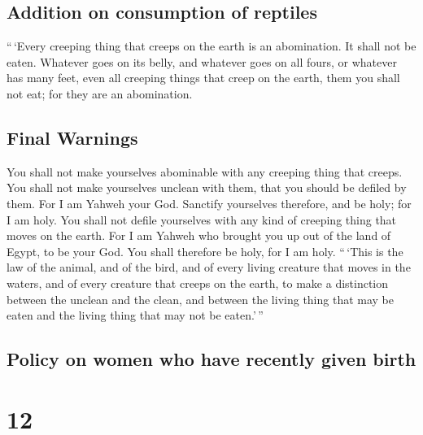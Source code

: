 \hypertarget{addition-on-consumption-of-reptiles}{%
\subsection{Addition on consumption of
reptiles}\label{addition-on-consumption-of-reptiles}}

 ``\,`Every creeping thing that creeps on the earth is an
abomination. It shall not be eaten.  Whatever goes on its
belly, and whatever goes on all fours, or whatever has many feet, even
all creeping things that creep on the earth, them you shall not eat; for
they are an abomination.

\hypertarget{final-warnings}{%
\subsection{Final Warnings}\label{final-warnings}}

 You shall not make yourselves abominable with any
creeping thing that creeps. You shall not make yourselves unclean with
them, that you should be defiled by them.  For I am
Yahweh your God. Sanctify yourselves therefore, and be holy; for I am
holy. You shall not defile yourselves with any kind of creeping thing
that moves on the earth.  For I am Yahweh who brought you
up out of the land of Egypt, to be your God. You shall therefore be
holy, for I am holy.  ``\,`This is the law of the animal,
and of the bird, and of every living creature that moves in the waters,
and of every creature that creeps on the earth,  to make
a distinction between the unclean and the clean, and between the living
thing that may be eaten and the living thing that may not be eaten.'\,''

\hypertarget{policy-on-women-who-have-recently-given-birth}{%
\subsection{Policy on women who have recently given
birth}\label{policy-on-women-who-have-recently-given-birth}}

\hypertarget{section-11}{%
\section{12}\label{section-11}}

